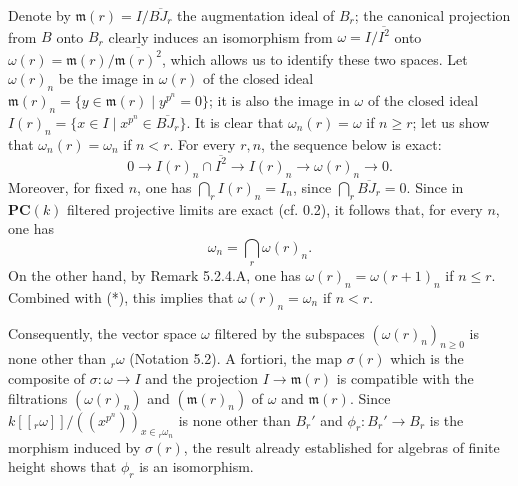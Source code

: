 Denote by $\mathfrak m(r)=I/\overline{BJ_r}$ the augmentation ideal of $B_r$; the canonical projection from $B$ onto $B_r$ clearly induces an isomorphism from $\omega=I/\overline{I^2}$ onto $\omega(r)=\mathfrak m(r)/\overline{\mathfrak m(r)^2}$, which allows us to identify these two spaces. Let $\omega(r)_n$ be the image in $\omega(r)$ of the closed ideal $\mathfrak m(r)_n=\{y\in\mathfrak m(r)\mid y^{p^n}=0\}$; it is also the image in $\omega$ of the closed ideal $I(r)_n=\{x\in I\mid x^{p^n}\in\overline{BJ_r}\}$. It is clear that $\omega_n(r)=\omega$ if $n\ge r$; let us show that $\omega_n(r)=\omega_n$ if $n<r$. For every $r,n$, the sequence below is exact:
\[
0\longrightarrow I(r)_n\cap\overline{I^2}\longrightarrow I(r)_n\longrightarrow\omega(r)_n\longrightarrow0.
\]
Moreover, for fixed $n$, one has $\bigcap_r I(r)_n=I_n$, since $\bigcap_r\overline{BJ_r}=0$. Since in $\mathbf{PC}(k)$ filtered projective limits are exact (cf. 0.2), it follows that, for every $n$, one has
\[
\omega_n=\bigcap_r\omega(r)_n.\tag{*}
\]
On the other hand, by Remark 5.2.4.A, one has $\omega(r)_n=\omega(r+1)_n$ if $n\le r$. Combined with (*), this implies that $\omega(r)_n=\omega_n$ if $n<r$.

Consequently, the vector space $\omega$ filtered by the subspaces $(\omega(r)_n)_{n\ge0}$ is none other than ${}_r\omega$ (Notation 5.2). A fortiori, the map $\sigma(r)$ which is the composite of $\sigma:\omega\to I$ and the projection $I\to\mathfrak m(r)$ is compatible with the filtrations $(\omega(r)_n)$ and $(\mathfrak m(r)_n)$ of $\omega$ and $\mathfrak m(r)$. Since $k[[{}_r\omega]]/((x^{p^n}))_{x\in{}_r\omega_n}$ is none other than $B_r'$ and $\phi_r:B_r'\to B_r$ is the morphism induced by $\sigma(r)$, the result already established for algebras of finite height shows that $\phi_r$ is an isomorphism.

